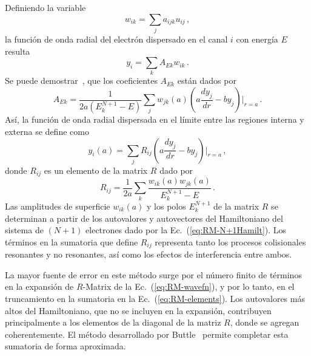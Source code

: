 Definiendo la variable
\begin{equation}
w_{ik}=\sum_j a_{ijk}u_{ij}\,,
\end{equation}
la función de onda radial del electrón dispersado en el canal $i$ con 
energía $E$ resulta
\begin{equation}
y_i=\sum_kA_{Ek}w_{ik}\,.
\end{equation}
Se puede demostrar~\cite{Burke:75}, que los coeficientes $A_{Ek}$ 
están dados por
\begin{equation}
A_{Ek}=\frac{1}{2a\left(E_k^{N+1}-E\right)}\sum_jw_{jk}(a)
\left(a\frac{dy_j}{dr}-by_j\right)\bigg|_{r=a}\,.
\end{equation}
Así, la función de onda radial dispersada en el límite entre las 
regiones interna y externa se define como
\begin{equation}
y_i(a)=\sum_j R_{ij}\left(a\frac{dy_j}{dr}-by_j\right)\bigg|_{r=a}\,,
\end{equation}
donde $R_{ij}$ es un elemento de la matrix $R$ dado por
\begin{equation}
R_{ij} = \frac{1}{2a}\sum_k\frac{w_{ik}(a)w_{jk}(a)}{E_k^{N+1}-E}\,.
\label{eq:RM-elements}
\end{equation}
Las amplitudes de superficie $w_{ik}(a)$ y los polos $E_k^{N+1}$ de la 
matrix $R$ se determinan a partir de los autovalores y autovectores del 
Hamiltoniano del sistema de $(N+1)$ electrones dado por la 
Ec.~(\ref{eq:RM-N+1Hamilt}). Los términos en la sumatoria que define 
$R_{ij}$ representa tanto los procesos colisionales resonantes y no 
resonantes, así como los efectos de interferencia entre ambos.

La mayor fuente de error en este método surge por el número finito de 
términos en la expansión de $R$-Matrix de la Ec.~(\ref{eq:RM-wavefn}), y 
por lo tanto, en el truncamiento en la sumatoria en la 
Ec.~(\ref{eq:RM-elements}). Los autovalores más altos del Hamiltoniano,
que no se incluyen en la expansión, contribuyen principalmente a los 
elementos de la diagonal de la matriz $R$, donde se agregan 
coherentemente. El método desarrollado por Buttle~\cite{Buttle:67} 
permite completar esta sumatoria de forma aproximada. 

